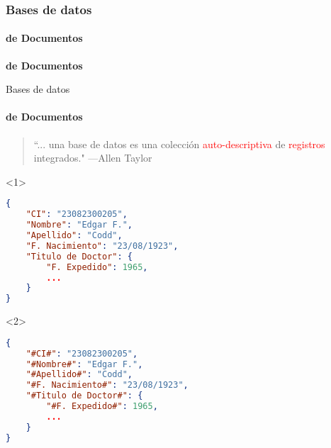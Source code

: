 \begin{frame}
    \frametitle{Bases de datos}
    \framesubtitle{de Documentos}

\begin{center}
    \Huge \textbf{de Documentos}
\end{center}
\end{frame}

\begin{frame}[fragile]{Bases de datos}
    \framesubtitle{de Documentos}

    \begin{overlayarea}{\linewidth}{\textheight}
        \begin{onlyenv}
            \begin{block}{}
                \begin{quote}
                    ``... una base de datos es una colecci\'on \textcolor<2>{red}{auto-descriptiva} de \textcolor<1>{red}{registros} integrados."
                    \hspace{1em plus 1fill}---Allen Taylor
                \end{quote}
            \end{block}
      \end{onlyenv}

      \vspace{5mm}

      \begin{center}
        
        \begin{minipage}{.6\textwidth}
            \begin{onlyenv}<1>
        \begin{lstlisting}[language=json]
{  
    "CI": "23082300205", 
    "Nombre": "Edgar F.", 
    "Apellido": "Codd", 
    "F. Nacimiento": "23/08/1923",
    "Titulo de Doctor": {
        "F. Expedido": 1965,
        ...
    }
}
        \end{lstlisting}
            \end{onlyenv}

\begin{onlyenv}<2>
        \begin{lstlisting}[language=json]
{  
    "#CI#": "23082300205", 
    "#Nombre#": "Edgar F.", 
    "#Apellido#": "Codd", 
    "#F. Nacimiento#": "23/08/1923",
    "#Titulo de Doctor#": {
        "#F. Expedido#": 1965,
        ...
    }
}
        \end{lstlisting}
\end{onlyenv}
        \end{minipage}
      \end{center}
    \end{overlayarea}

\end{frame}

